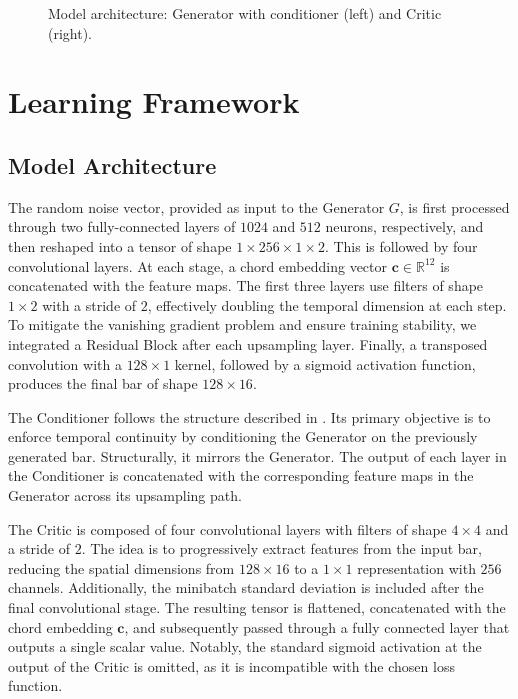 
\begin{figure}[!t]
    \centering
    \caption{Model architecture: Generator with conditioner (left) and Critic (right).}
    \label{fig:model_architecture}
\end{figure}

\section{Learning Framework}
\label{sec:learning_framework}

\subsection{Model Architecture}
\label{sec:model_architecture}

The random noise vector, provided as input to the Generator $G$, is first processed through two fully-connected layers of $1024$ and $512$ neurons, respectively, and then reshaped into a tensor of shape $1 \times 256 \times 1 \times 2$.
This is followed by four convolutional layers.
At each stage, a chord embedding vector $\bm{c} \in \mathbb{R}^{12}$ is concatenated with the feature maps.
The first three layers use filters of shape $1 \times 2$ with a stride of $2$, effectively doubling the temporal dimension at each step.
To mitigate the vanishing gradient problem and ensure training stability, we integrated a Residual Block after each upsampling layer.
Finally, a transposed convolution with a $128 \times 1$ kernel, followed by a sigmoid activation function, produces the final bar of shape $128 \times 16$.

The Conditioner follows the structure described in \cite{Yang-2017}.
Its primary objective is to enforce temporal continuity by conditioning the Generator on the previously generated bar.
Structurally, it mirrors the Generator.
The output of each layer in the Conditioner is concatenated with the corresponding feature maps in the Generator across its upsampling path.

The Critic is composed of four convolutional layers with filters of shape $4 \times 4$ and a stride of $2$.
The idea is to progressively extract features from the input bar, reducing the spatial dimensions from $128 \times 16$ to a $1 \times 1$ representation with $256$ channels.
Additionally, the minibatch standard deviation is included after the final convolutional stage.
The resulting tensor is flattened, concatenated with the chord embedding $\bm{c}$, and subsequently passed through a fully connected layer that outputs a single scalar value.
Notably, the standard sigmoid activation at the output of the Critic is omitted, as it is incompatible with the chosen loss function.

